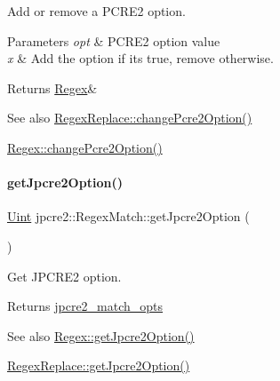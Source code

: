 Add or remove a P\+C\+R\+E2 option. 


\begin{DoxyParams}{Parameters}
{\em opt} & P\+C\+R\+E2 option value \\
\hline
{\em x} & Add the option if it\textquotesingle{}s true, remove otherwise. \\
\hline
\end{DoxyParams}
\begin{DoxyReturn}{Returns}
\hyperlink{classjpcre2_1_1Regex}{Regex}\& 
\end{DoxyReturn}
\begin{DoxySeeAlso}{See also}
\hyperlink{classjpcre2_1_1RegexReplace_aea15c694bba7d994f048596a1f90f71f_aea15c694bba7d994f048596a1f90f71f}{Regex\+Replace\+::change\+Pcre2\+Option()} 

\hyperlink{classjpcre2_1_1Regex_ae5bde8008cc5a700163ca3162dbd5823_ae5bde8008cc5a700163ca3162dbd5823}{Regex\+::change\+Pcre2\+Option()} 
\end{DoxySeeAlso}
\hypertarget{classjpcre2_1_1RegexMatch_a4ea72774ae5e9a93d649dcb0840efd7f_a4ea72774ae5e9a93d649dcb0840efd7f}{}\label{classjpcre2_1_1RegexMatch_a4ea72774ae5e9a93d649dcb0840efd7f_a4ea72774ae5e9a93d649dcb0840efd7f} 
\paragraph{\texorpdfstring{get\+Jpcre2\+Option()}{getJpcre2Option()}}
{\footnotesize\ttfamily \hyperlink{namespacejpcre2_a078242d38221a13fb3543b9edd78c099}{Uint} jpcre2\+::\+Regex\+Match\+::get\+Jpcre2\+Option (\begin{DoxyParamCaption}{ }\end{DoxyParamCaption})\hspace{0.3cm}{\ttfamily [inline]}}



Get J\+P\+C\+R\+E2 option. 

\begin{DoxyReturn}{Returns}
\hyperlink{classjpcre2_1_1RegexMatch_a70d62df887eeed237724f64fbc378700}{jpcre2\+\_\+match\+\_\+opts} 
\end{DoxyReturn}
\begin{DoxySeeAlso}{See also}
\hyperlink{classjpcre2_1_1Regex_a5d2d04eb7c393338a4c8cce941e957ef_a5d2d04eb7c393338a4c8cce941e957ef}{Regex\+::get\+Jpcre2\+Option()} 

\hyperlink{classjpcre2_1_1RegexReplace_addc36e1c991b639d549a32d1151c04df_addc36e1c991b639d549a32d1151c04df}{Regex\+Replace\+::get\+Jpcre2\+Option()} 
\end{DoxySeeAlso}
\hypertarget{classjpcre2_1_1RegexMatch_a909abcce3c02b07cfcd1173a9d0be9ba_a909abcce3c02b07cfcd1173a9d0be9ba}{}\label{classjpcre2_1_1RegexMatch_a909abcce3c02b07cfcd1173a9d0be9ba_a909abcce3c02b07cfcd1173a9d0be9ba} 

